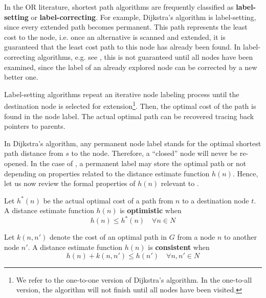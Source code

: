 In the OR literature, shortest path algorithms are frequently classified as \textbf{label-setting} or \textbf{label-correcting}. For example, Dijkstra's algorithm \citep{dijkstra1959} is label-setting, since every extended path becomes permanent. This path represents the least cost to the node, i.e. once an alternative is scanned and extended, it is guaranteed that the least cost path to this node has already been found. In label-correcting algorithms, e.g. see \citep{zhannoon2000}, this is not guaranteed until all nodes have been examined, since the label of an already explored node can be corrected by a new better one.

Label-setting algorithms repeat an iterative node labeling process until the destination node is selected for extension\footnote{We refer to the one-to-one version of Dijkstra's algorithm. In the one-to-all version, the algorithm will not finish until all nodes have been visited.}. Then, the optimal cost of the path is found in the node label. The actual optimal path can be recovered tracing back pointers to parents.

In Dijkstra's algorithm, any permanent node label stands for the optimal shortest path distance from $s$ to the node. Therefore, a ``closed'' node will never be re-opened. In the case of \astar, a permanent label may store the optimal path or not depending on properties related to the distance estimate function $h(n)$. Hence, let us now review the formal properties of $h(n)$ relevant to \astar. 

\begin{defi}\label{chapMultiObjAlg:def:singleObjoptimistic}
Let $h^*(n)$ be the actual optimal cost of a path from $n$ to a destination node $t$. A distance estimate function $h(n)$ is \textbf{optimistic} when
\begin{equation}\label{chapMultiObjAlg:eq:singleObjoptimistic}
 h(n) \leq h^*(n) \quad \forall n \in N 
\end{equation}
\end{defi}

\begin{defi}\label{chapMultiObjAlg:def:singleObjConsistency}
Let $k(n,n')$ denote the cost of an optimal path in $G$ from a node $n$ to another node $n'$. A distance estimate function $h(n)$ is \textbf{consistent} when 
\begin{equation}\label{chapMultiObjAlg:eq:singleObjConsistency}
 h(n) + k(n,n') \leq h(n') \quad \forall n,n' \in N 
\end{equation}
\end{defi}

